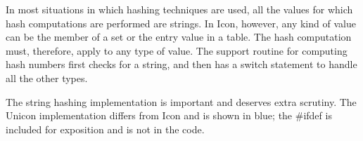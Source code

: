 In most situations in which hashing techniques are used, all the
values for which hash computations are performed are strings. In Icon,
however, any kind of value can be the member of a set or the entry
value in a table. The hash computation must, therefore, apply to any
type of value. The support routine for computing hash numbers first
checks for a string, and then has a switch statement to handle all
the other types.

The string hashing implementation is important and deserves extra
scrutiny. The Unicon implementation differs from Icon and is shown
in blue; the \#ifdef is included for exposition and is not in the code.

